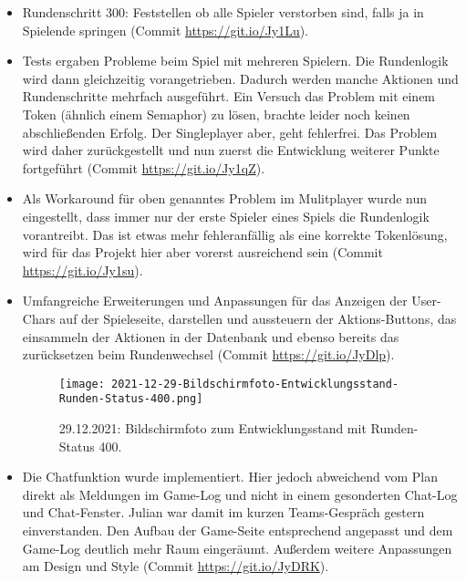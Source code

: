     \begin{itemize}
        \item Rundenschritt 300: Feststellen ob alle Spieler verstorben sind, falls ja in Spielende springen (Commit \url{https://git.io/Jy1Lu}).
        \item Tests ergaben Probleme beim Spiel mit mehreren Spielern. Die Rundenlogik wird dann gleichzeitig vorangetrieben. Dadurch werden manche Aktionen und Rundenschritte mehrfach ausgeführt. Ein Versuch das Problem mit einem Token (ähnlich einem Semaphor) zu lösen, brachte leider noch keinen abschließenden Erfolg. Der Singleplayer aber, geht fehlerfrei. Das Problem wird daher zurückgestellt und nun zuerst die Entwicklung weiterer Punkte fortgeführt (Commit \url{https://git.io/Jy1qZ}).
        \item Als Workaround für oben genanntes Problem im Mulitplayer wurde nun eingestellt, dass immer nur der erste Spieler eines Spiels die Rundenlogik vorantreibt. Das ist etwas mehr fehleranfällig als eine korrekte Tokenlösung, wird für das Projekt hier aber vorerst ausreichend sein (Commit \url{https://git.io/Jy1su}).
        \item Umfangreiche Erweiterungen und Anpassungen für das Anzeigen der User-Chars auf der Spieleseite, darstellen und aussteuern der Aktions-Buttons, das einsammeln der Aktionen in der Datenbank und ebenso bereits das zurücksetzen beim Rundenwechsel (Commit \url{https://git.io/JyDlp}).
    
        \begin{figure}[H]
            \centering
            \caption{29.12.2021: Bildschirmfoto zum Entwicklungsstand mit Runden-Status 400.}
            \label{fig:2021-12-29-Bildschirmfoto-Entwicklungsstand-Runden-Status-400.png}
            \texttt{[image: 2021-12-29-Bildschirmfoto-Entwicklungsstand-Runden-Status-400.png]}
        \end{figure}
    
        \item Die Chatfunktion wurde implementiert. Hier jedoch abweichend vom Plan direkt als Meldungen im Game-Log und nicht in einem gesonderten Chat-Log und Chat-Fenster. Julian war damit im kurzen Teams-Gespräch gestern einverstanden. Den Aufbau der Game-Seite entsprechend angepasst und dem Game-Log deutlich mehr Raum eingeräumt. Außerdem weitere Anpassungen am Design und Style (Commit \url{https://git.io/JyDRK}).
    
    \end{itemize}
    





